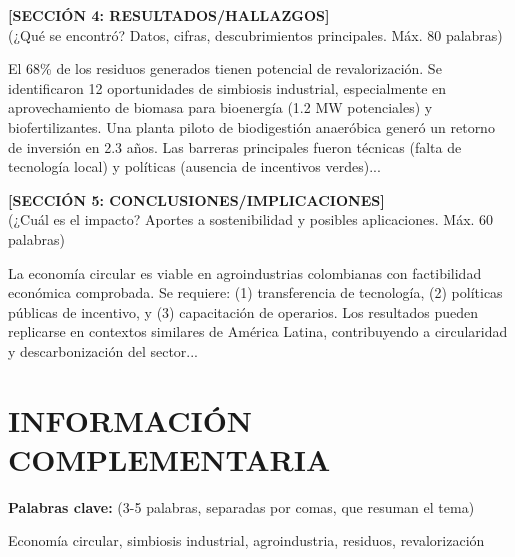 \documentclass[12pt,a4paper]{article}
\begin{document}
\vspace{0.8cm}

\noindent
\textbf{[SECCIÓN 4: RESULTADOS/HALLAZGOS]}\\
(¿Qué se encontró? Datos, cifras, descubrimientos principales. Máx. 80 palabras)

\vspace{0.3cm}

El 68\% de los residuos generados tienen potencial de revalorización. Se identificaron 12 oportunidades de simbiosis industrial, especialmente en aprovechamiento de biomasa para bioenergía (1.2 MW potenciales) y biofertilizantes. Una planta piloto de biodigestión anaeróbica generó un retorno de inversión en 2.3 años. Las barreras principales fueron técnicas (falta de tecnología local) y políticas (ausencia de incentivos verdes)...

\vspace{0.8cm}

\noindent
\textbf{[SECCIÓN 5: CONCLUSIONES/IMPLICACIONES]}\\
(¿Cuál es el impacto? Aportes a sostenibilidad y posibles aplicaciones. Máx. 60 palabras)

\vspace{0.3cm}

La economía circular es viable en agroindustrias colombianas con factibilidad económica comprobada. Se requiere: (1) transferencia de tecnología, (2) políticas públicas de incentivo, y (3) capacitación de operarios. Los resultados pueden replicarse en contextos similares de América Latina, contribuyendo a circularidad y descarbonización del sector...

\newpage

\section*{INFORMACIÓN COMPLEMENTARIA}

\vspace{0.8cm}

\noindent
\textbf{Palabras clave:} (3-5 palabras, separadas por comas, que resuman el tema)

\vspace{0.3cm}

Economía circular, simbiosis industrial, agroindustria, residuos, revalorización

\vspace{0.8cm}
\end{document}
